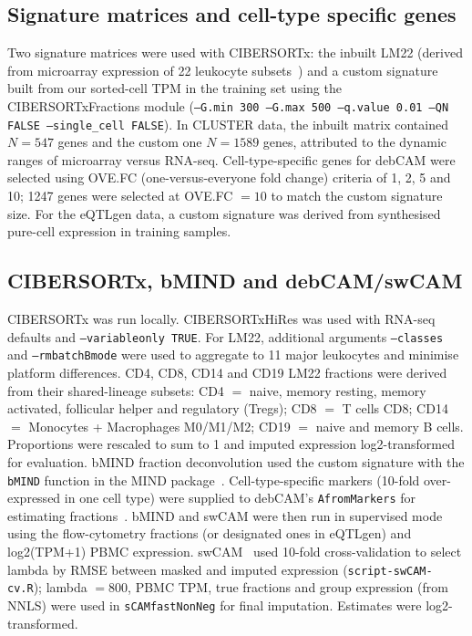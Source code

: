 \documentclass[11pt]{article}
\begin{document}
\subsection{Signature matrices and cell-type specific genes}
Two signature matrices were used with CIBERSORTx: the inbuilt LM22 (derived from microarray expression of 22 leukocyte subsets~\citep{newman2015cibersort}) and a custom signature built from our sorted-cell TPM in the training set using the CIBERSORTxFractions module (\texttt{--G.min 300 --G.max 500 --q.value 0.01 --QN FALSE --single\_cell FALSE}). In CLUSTER data, the inbuilt matrix contained $N=547$ genes and the custom one $N=1589$ genes, attributed to the dynamic ranges of microarray versus RNA-seq. Cell-type-specific genes for debCAM were selected using OVE.FC (one-versus-everyone fold change) criteria of 1, 2, 5 and 10; 1247 genes were selected at OVE.FC $=10$ to match the custom signature size. For the eQTLgen data, a custom signature was derived from synthesised pure-cell expression in training samples.

\subsection{CIBERSORTx, bMIND and debCAM/swCAM}
CIBERSORTx was run locally. CIBERSORTxHiRes was used with RNA-seq defaults and \texttt{--variableonly TRUE}. For LM22, additional arguments \texttt{--classes} and \texttt{--rmbatchBmode} were used to aggregate to 11 major leukocytes and minimise platform differences. CD4, CD8, CD14 and CD19 LM22 fractions were derived from their shared-lineage subsets: CD4 $=$ naive, memory resting, memory activated, follicular helper and regulatory (Tregs); CD8 $=$ T cells CD8; CD14 $=$ Monocytes + Macrophages M0/M1/M2; CD19 $=$ naive and memory B cells. Proportions were rescaled to sum to 1 and imputed expression log2-transformed for evaluation. bMIND fraction deconvolution used the custom signature with the \texttt{bMIND} function in the MIND package~\citep{wang2021bmind}. Cell-type-specific markers (10-fold over-expressed in one cell type) were supplied to debCAM's \texttt{AfromMarkers} for estimating fractions~\citep{wang2016debcam}. bMIND and swCAM were then run in supervised mode using the flow-cytometry fractions (or designated ones in eQTLgen) and log2(TPM+1) PBMC expression. swCAM~\citep{chen2022swcam} used 10-fold cross-validation to select lambda by RMSE between masked and imputed expression (\texttt{script-swCAM-cv.R}); lambda $=800$, PBMC TPM, true fractions and group expression (from NNLS) were used in \texttt{sCAMfastNonNeg} for final imputation. Estimates were log2-transformed.
\end{document}

